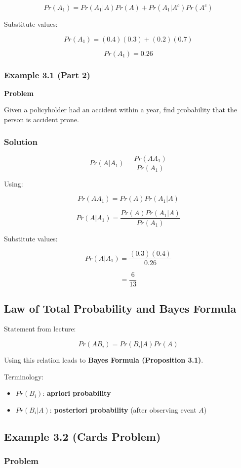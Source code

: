 \documentclass[12pt]{article}
\begin{document}
\[
Pr(A_1) = Pr(A_1|A)Pr(A) + Pr(A_1|A^c)Pr(A^c)
\]

Substitute values:

\[
Pr(A_1) = (0.4)(0.3) + (0.2)(0.7)
\]

\[
Pr(A_1) = 0.26
\]

\subsubsection*{Example 3.1 (Part 2)}

\textbf{Problem}

Given a policyholder had an accident within a year, find probability that the person is accident prone.

\subsubsection*{Solution}

\[
Pr(A|A_1) = \frac{Pr(AA_1)}{Pr(A_1)}
\]

Using:

\[
Pr(AA_1) = Pr(A)Pr(A_1|A)
\]

\[
Pr(A|A_1) =
\frac{Pr(A)Pr(A_1|A)}{Pr(A_1)}
\]

Substitute values:

\[
Pr(A|A_1) = \frac{(0.3)(0.4)}{0.26}
\]

\[
= \frac{6}{13}
\]

\subsection{Law of Total Probability and Bayes Formula}

Statement from lecture:

\[
Pr(AB_i) = Pr(B_i|A)Pr(A)
\]

Using this relation leads to \textbf{Bayes Formula (Proposition 3.1)}.

Terminology:
\begin{itemize}
\item $Pr(B_i)$: \textbf{apriori probability}
\item $Pr(B_i|A)$: \textbf{posteriori probability} (after observing event $A$)
\end{itemize}

\subsection{Example 3.2 (Cards Problem)}

\subsubsection*{Problem}
\end{document}
